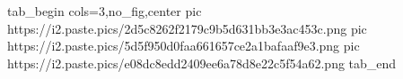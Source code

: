  
 
 
 
 


\ifcmt
  tab_begin cols=3,no_fig,center
     pic https://i2.paste.pics/2d5c8262f2179c9b5d631bb3e3ac453c.png
		 pic https://i2.paste.pics/5d5f950d0faa661657ce2a1bafaaf9e3.png
		 pic https://i2.paste.pics/e08dc8edd2409ee6a78d8e22c5f54a62.png
  tab_end
\fi
